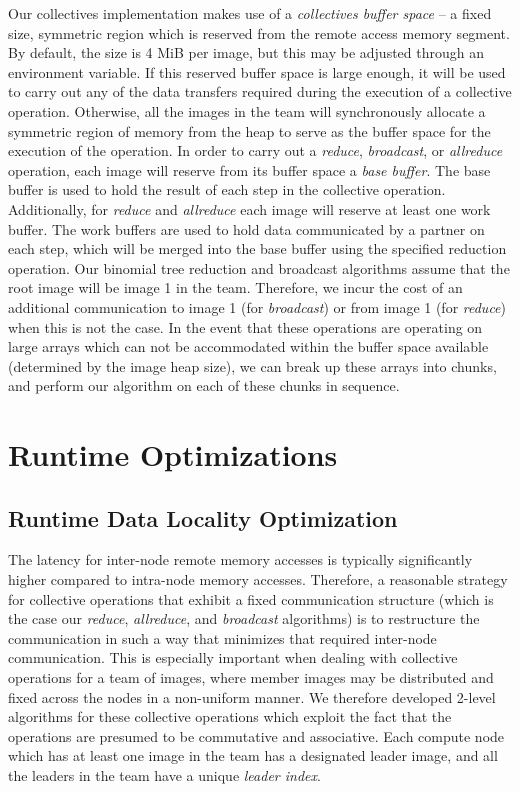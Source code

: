 Our collectives implementation makes use of a \textit{collectives buffer
space} --  a fixed size, symmetric region which is reserved from the remote
access memory segment. By default, the size is 4 MiB per image, but this may be
adjusted through an environment variable. If this reserved buffer space is large
enough, it will be used to carry out any of the data transfers required during
the execution of a collective operation. Otherwise, all the images in the team
will synchronously allocate a symmetric region of memory from the heap to
serve as the buffer space for the execution of the operation. In order to
carry out a \textit{reduce}, \textit{broadcast}, or \textit{allreduce}
operation, each image will reserve from its buffer space a \textit{base
buffer}.  The base buffer is used to hold the result of each step in the
collective operation. Additionally, for \textit{reduce} and \textit{allreduce}
each image will reserve at least one work buffer. The work buffers are used to
hold data communicated by a partner on each step, which will be merged into
the base buffer using the specified reduction operation. Our binomial tree
reduction and broadcast algorithms assume that the root image will be image 1
in the team. Therefore, we incur the cost of an additional communication to
image 1 (for \textit{broadcast}) or from image 1 (for \textit{reduce}) when
this is not the case. In the event that these operations are operating on
large arrays which can not be accommodated within the buffer space available
(determined by the image heap size), we can break up these arrays into chunks,
and perform our algorithm on each of these chunks in sequence.

\section{Runtime Optimizations}

\subsection{Runtime Data Locality Optimization}
The latency for inter-node remote memory accesses is typically significantly
higher compared to intra-node memory accesses. Therefore, a reasonable
strategy for collective operations that exhibit a fixed communication
structure (which is the case our \textit{reduce}, \textit{allreduce}, and
\textit{broadcast} algorithms)
is to restructure the communication in such a way that minimizes that required
inter-node communication. This is especially important when dealing with
collective operations for a team of images, where member images may be
distributed and fixed across the nodes in a non-uniform manner. We therefore developed
2-level algorithms for these collective operations which exploit the fact that
the operations are presumed to be commutative and associative.  %
Each compute node which has at least one image in the team has a designated
leader image, and all the leaders in the team have a unique \textit{leader
index}.

